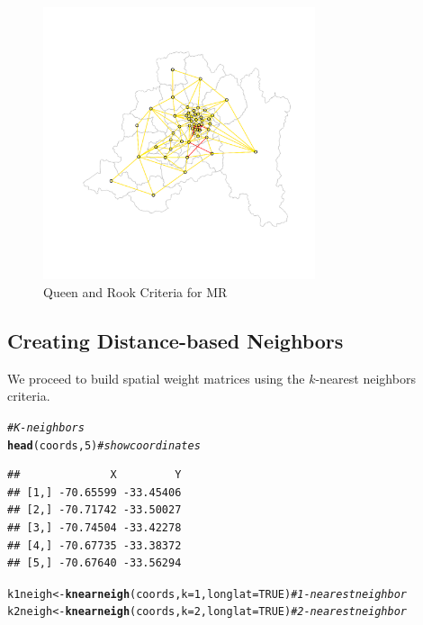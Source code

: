 \documentclass[english,12pt]{book}\usepackage[]{graphicx}\usepackage[]{xcolor}
\makeatletter
\newcommand{\hlnum}[1]{\textcolor[rgb]{0.686,0.059,0.569}{#1}}%
\newcommand{\hlcom}[1]{\textcolor[rgb]{0.678,0.584,0.686}{\textit{#1}}}%
\newcommand{\hlstd}[1]{\textcolor[rgb]{0.345,0.345,0.345}{#1}}%
\newcommand{\hlkwb}[1]{\textcolor[rgb]{0.69,0.353,0.396}{#1}}%
\newcommand{\hlkwc}[1]{\textcolor[rgb]{0.333,0.667,0.333}{#1}}%
\newcommand{\hlkwd}[1]{\textcolor[rgb]{0.737,0.353,0.396}{\textbf{#1}}}%
\newenvironment{kframe}{%
 \def\at@end@of@kframe{}%
 \ifinner\ifhmode%
  \def\at@end@of@kframe{\end{minipage}}%
  \begin{minipage}{\columnwidth}%
 \fi\fi%
 \def\FrameCommand##1{\hskip\@totalleftmargin \hskip-\fboxsep
 \colorbox{shadecolor}{##1}\hskip-\fboxsep
     \hskip-\linewidth \hskip-\@totalleftmargin \hskip\columnwidth}%
 \MakeFramed {\advance\hsize-\width
   \@totalleftmargin\z@ \linewidth\hsize
   \@setminipage}}%
 {\par\unskip\endMakeFramed%
 \at@end@of@kframe}
\newenvironment{knitrout}{}{} %
\makeatother
\begin{document}
\begin{figure}[ht]
  \caption{Queen and Rook Criteria for MR}
    \label{fig:Queen-Rook}
\begin{knitrout}
\color{fgcolor}

{\centering \includegraphics[width=8cm,height=8cm]{figure/plot-queen-rookT-1} 

}


\end{knitrout}
\end{figure}

\subsection{Creating Distance-based Neighbors}

We proceed to build spatial weight matrices using the $k$-nearest neighbors criteria. 

\begin{knitrout}
\color{fgcolor}\begin{kframe}
\begin{alltt}
\hlcom{# K-neighbors}
\hlkwd{head}\hlstd{(coords,} \hlnum{5}\hlstd{)}                                       \hlcom{# show coordinates}
\end{alltt}
\begin{verbatim}
##              X         Y
## [1,] -70.65599 -33.45406
## [2,] -70.71742 -33.50027
## [3,] -70.74504 -33.42278
## [4,] -70.67735 -33.38372
## [5,] -70.67640 -33.56294
\end{verbatim}
\begin{alltt}
\hlstd{k1neigh} \hlkwb{<-} \hlkwd{knearneigh}\hlstd{(coords,} \hlkwc{k} \hlstd{=} \hlnum{1}\hlstd{,} \hlkwc{longlat} \hlstd{=} \hlnum{TRUE}\hlstd{)}  \hlcom{# 1-nearest neighbor}
\hlstd{k2neigh} \hlkwb{<-} \hlkwd{knearneigh}\hlstd{(coords,} \hlkwc{k} \hlstd{=} \hlnum{2}\hlstd{,} \hlkwc{longlat} \hlstd{=} \hlnum{TRUE}\hlstd{)}  \hlcom{# 2-nearest neighbor}
\end{alltt}
\end{kframe}
\end{knitrout}
\end{document}
